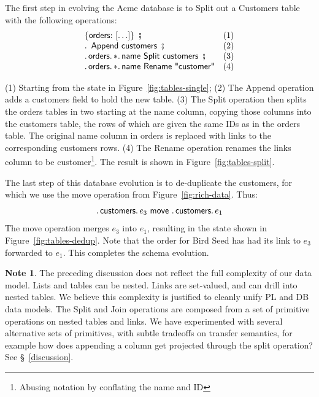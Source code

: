 \documentclass[english,submission]{programming}
\theoremstyle{definition}
\newtheorem*{note}{Note}
\newcommand{\mathbox}[1]{\colorbox{black!10}{$#1$\phantom{i\hspace{-3.5pt}}}}
\DeclareMathOperator{\exec}{\ \fatsemi\ \ }
\newcommand{\is}{{:}\ }
\newcommand{\quotedstring}[1]{\textsf{\textquotedbl{#1}\textquotedbl}}
\begin{document}
The first step in evolving the Acme database is to \textsf{Split} out a \textsf{Customers} table with the following operations:
\[
\begin{array}{ll}
\{ \textsf{orders}\is [ \ldots ]\} \exec & \textrm{(1)}\\
\ldotp \textsf{ Append } \textsf{customers} \exec  & \textrm{(2)}\\
\ldotp \textsf{orders}\ldotp * \ldotp \textsf{name Split customers} \exec & \textrm{(3)}\\
\ldotp \textsf{orders}\ldotp * \ldotp \textsf{name Rename } \quotedstring{customer} & \textrm{(4)}\\
\end{array}\]


(1) Starting from the state in Figure~\ref{fig:tables-single};
(2) The \textsf{Append} operation adds a \textsf{customers} field to hold the new table. (3) The \textsf{Split} operation then splits the \textsf{orders} tables in two starting at the \textsf{name} column, copying those columns into the \textsf{customers} table, the rows of which are given the same IDs as in the \textsf{orders} table.
The original \textsf{name} column in \textsf{orders} is replaced with links to the corresponding \textsf{customers} rows.
(4) The \textsf{Rename} operation renames the links column to be \textsf{customer}\footnote{Abusing notation by conflating the name and ID}.
The result is shown in Figure~\ref{fig:tables-split}.

The last step of this database evolution is to de-duplicate the customers, for which we use the \textsf{move} operation from Figure~\ref{fig:rich-data}. Thus:
\[
\ldotp \textsf{customers}\ldotp e_3 \textsf{ move } \ldotp \textsf{customers}\ldotp e_1
\]
The \textsf{move} operation merges \mathbox{e_3} into \mathbox{e_1}, resulting in the state shown in  Figure~\ref{fig:tables-dedup}. Note that the order for Bird Seed has had its link to \mathbox{e_3} forwarded to \mathbox{e_1}. This completes the schema evolution.

\begin{note}
The preceding discussion does not reflect the full complexity of our data model. Lists and tables can be nested. Links are set-valued, and can drill into nested tables. We believe this complexity is justified to cleanly unify PL and DB data models. The \textsf{Split} and \textsf{Join} operations are composed from a set of primitive operations on nested tables and links. We have experimented with several alternative sets of primitives, with subtle tradeoffs on transfer semantics, for example how does appending a column get projected through the split operation? See \S~\ref{discussion}.
\end{note}
\end{document}
